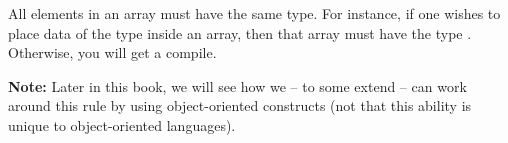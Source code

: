 All elements in an array must have the same type. For instance, if one wishes to place data of the type  inside an array, then that array must have the type . Otherwise, you will get a compile.

\textbf{Note:} Later in this book, we will see how we -- to some extend -- can work around this rule by using object-oriented constructs (not that this ability is unique to object-oriented languages).
